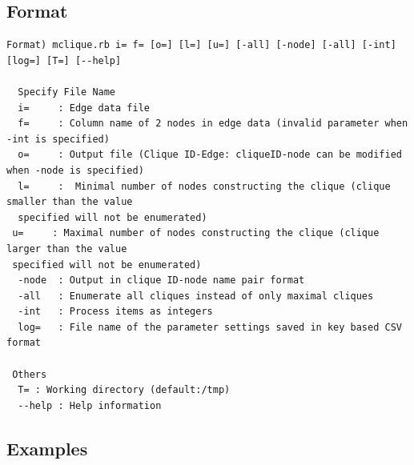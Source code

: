 


\subsection{Format}
\begin{verbatim}
Format) mclique.rb i= f= [o=] [l=] [u=] [-all] [-node] [-all] [-int] [log=] [T=] [--help] 

  Specify File Name 
  i=     : Edge data file 
  f=     : Column name of 2 nodes in edge data (invalid parameter when -int is specified)
  o=     : Output file (Clique ID-Edge: cliqueID-node can be modified when -node is specified)
  l=     :  Minimal number of nodes constructing the clique (clique smaller than the value 
  specified will not be enumerated) 
 u=     : Maximal number of nodes constructing the clique (clique larger than the value 
 specified will not be enumerated)
  -node  : Output in clique ID-node name pair format 
  -all   : Enumerate all cliques instead of only maximal cliques
  -int   : Process items as integers
  log=   : File name of the parameter settings saved in key based CSV format

 Others
  T= : Working directory (default:/tmp)
  --help : Help information 
\end{verbatim}

\subsection{Examples}



